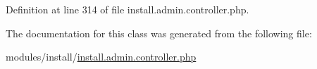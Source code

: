 Definition at line 314 of file install.\-admin.\-controller.\-php.



The documentation for this class was generated from the following file\-:\begin{DoxyCompactItemize}
\item 
modules/install/\hyperlink{install_8admin_8controller_8php}{install.\-admin.\-controller.\-php}\end{DoxyCompactItemize}
